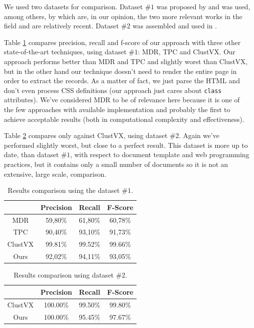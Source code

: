 \documentclass{vldb}
\begin{document}
We used two datasets for comparison. Dataset $\#1$ was proposed by
\cite{yamada2004testbed} and was used, among others, by \cite{TPC09,clustVX2014}
which are, in our opinion, the two more relevant works in the field and are
relatively recent. Dataset $\#2$ was assembled and used in \cite{clustVX2014}.

Table \ref{table:compare1} compares precision, recall and f-score of our
approach with three other state-of-the-art techniques, using dataset $\#1$:
MDR\cite{MDR03}, TPC\cite{TPC09} and ClustVX\cite{clustVX2014}. Our approach performs better than
MDR and TPC and slightly worst than ClustVX, but in the other hand our technique
doesn't need to render the entire page in order to extract the records. As a
matter of fact, we just parse the HTML and don't even process CSS definitions
(our approach just cares about \texttt{class} attributes).
We've considered MDR to be of relevance here because it is one of the few
approaches with available implementation and probably the first to achieve
acceptable results (both in computational complexity and effectiveness).

Table \ref{table:compare2} compares only against ClustVX, using dataset $\#2$.
Again we've performed slightly worst, but close to a perfect result. This
dataset is more up to date, than dataset $\#1$, with respect to document
template and web programming practices, but it contains only a small number of
documents so it is not an extensive, large scale, comparison.

\begin{table}[h]
\centering
\caption{Results comparison using the dataset $\#1$.}
\label{table:compare1}
\begin{tabular}
{|c| c| c| c|}\hline
	& Precision	& Recall	& F-Score\\ \hline
MDR\cite{MDR03} &	59,80\%	& 61,80\%	& 60,78\%\\ \hline
TPC\cite{TPC09}	& 90,40\%	& 93,10\%	& 91,73\%\\ \hline
ClustVX\cite{clustVX2014} &	99.81\% & 99.52\% & 99.66\%\\ \hline
Ours &	92,02\%	& 94,11\%	& 93,05\% \\ \hline
\end{tabular}
\end{table}

\begin{table}[h]
\centering
\caption{Results comparison using dataset $\#2$.}
\label{table:compare2}
\begin{tabular}
{|c| c| c| c|}\hline
	& Precision	& Recall	& F-Score\\ \hline
ClustVX\cite{clustVX2014} &	100.00\% & 99.50\% & 99.80\%\\ \hline
Ours &	100.00\% & 95.45\% & 97.67\% \\ \hline
\end{tabular}
\end{table}
\end{document}
